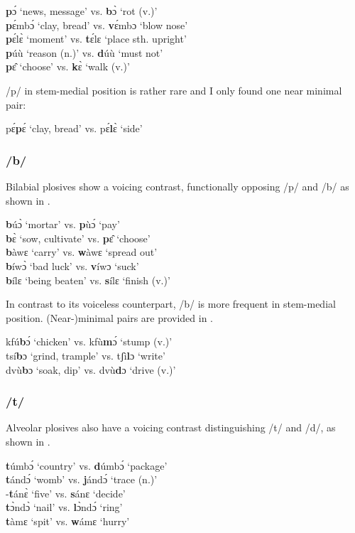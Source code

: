 \ea \label{p}
{\bfseries p}ɔ́ `news, message' vs. {\bfseries b}ɔ̀ `rot (v.)' \\
{\bfseries p}ɛ́mbɔ́ `clay, bread' vs. {\bfseries v}ɛ́mbɔ `blow nose' \\
{\bfseries p}ɛ́lɛ̀ `moment' vs. {\bfseries t}ɛ́lɛ `place sth. upright'  \\
{\bfseries p}úù `reason (n.)' vs. {\bfseries d}úù `must not'  \\
{\bfseries p}ɛ̂ `choose' vs. {\bfseries k}ɛ̀ `walk (v.)'
\z

\noindent /p/ in stem-medial position is rather rare and I only found one near minimal pair:

\ea \label{pm}
pɛ́{\bfseries p}ɛ́ `clay, bread' vs. pɛ́{\bfseries l}ɛ̀ `side' 
\z


\subsubsection*{\bfseries /b/} Bilabial plosives show a voicing contrast, functionally opposing /p/ and /b/ as shown in .

\ea \label{b}
{\bfseries b}úɔ̀ `mortar'   vs. {\bfseries p}ùɔ́ `pay' \\
{\bfseries b}ɛ̀  `sow, cultivate'  vs. {\bfseries p}ɛ̂ `choose' \\
{\bfseries b}àwɛ `carry' vs. {\bfseries w}àwɛ `spread out' \\
{\bfseries b}íwɔ̀ `bad luck' vs. {\bfseries v}íwɔ `suck' \\
{\bfseries b}ílɛ `being beaten' vs. {\bfseries s}ílɛ `finish (v.)'
\z

\noindent In contrast to its voiceless counterpart, /b/ is more frequent in stem-medial position. (Near-)minimal pairs are provided in .

\ea \label{bm}
kfú{\bfseries b}ɔ́ `chicken' vs. kfù{\bfseries m}ɔ́ `stump (v.)' \\
tsí{\bfseries b}ɔ `grind, trample' vs. tʃì{\bfseries l}ɔ `write' \\
dvù{\bfseries b}ɔ `soak, dip' vs. dvù{\bfseries d}ɔ `drive (v.)'
\z

\subsubsection*{\bfseries /t/} Alveolar plosives also have a voicing contrast distinguishing /t/ and /d/, as shown in .

\ea \label{t}
{\bfseries t}úmbɔ́  `country'  vs. {\bfseries d}úmbɔ́ `package' \\
{\bfseries t}ándɔ́ `womb'  vs. {\bfseries j}ándɔ́ `trace (n.)' \\
-{\bfseries t}ánɛ̀ `five' vs. {\bfseries s}ánɛ `decide' \\
{\bfseries t}ɔ̀ndɔ̀ `nail' vs. {\bfseries l}ɔ̀ndɔ́ `ring' \\
{\bfseries t}àmɛ `spit' vs. {\bfseries w}ámɛ `hurry'
\z

